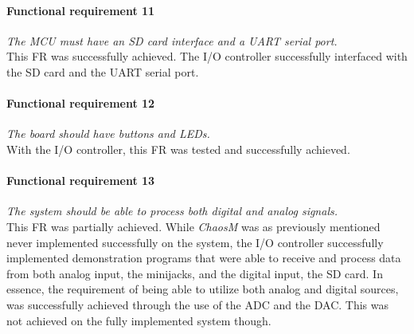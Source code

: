 \paragraph{Functional requirement 11}
\textit{The MCU must have an SD card interface and a UART serial port.}\\
This FR was successfully achieved. The I/O controller successfully interfaced with the SD card and the UART serial port.

\paragraph{Functional requirement 12}
\textit{The board should have buttons and LEDs.}\\
With the I/O controller, this FR was tested and successfully achieved.

\paragraph{Functional requirement 13}
\textit{The system should be able to process both digital and analog signals.}\\
This FR was partially achieved. While \textit{ChaosM} was as previously mentioned never implemented successfully on the system, the I/O controller successfully implemented demonstration programs that were able to receive and process data from both analog input, the minijacks, and the digital input, the SD card.
In essence, the requirement of being able to utilize both analog and digital sources, was successfully achieved through the use of the ADC and the DAC. This was not achieved on the fully implemented system though.



\clearpage



